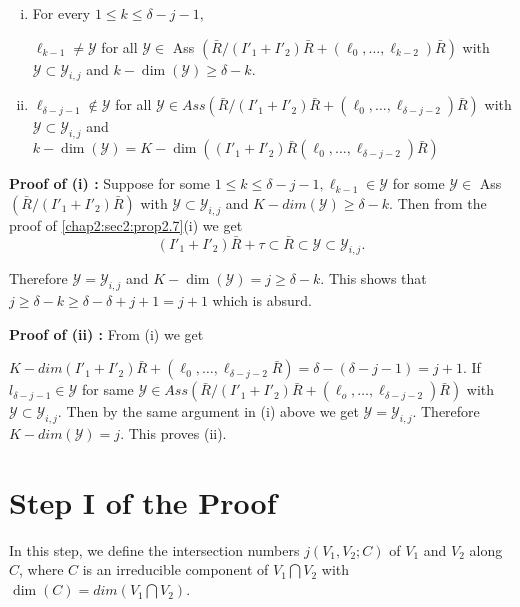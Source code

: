 \begin{enumerate}[(i)]
\item For every $1 \leq k \leq \delta -j-1$,

  $\ell_{k-1}\neq \mathscr{Y}$ for all $\mathscr{Y} \in$ Ass
  $(\bar{R}/(I'_1+I'_2)\bar{R}+(\ell_0,\ldots, \ell_{k-2})\bar{R})$
  with $\mathscr{Y}\subset \mathscr{Y}_{i,j}$ and $k-\dim
  (\mathscr{Y})\geq \delta -k$. 

\item $\ell_{\delta -j-1} \notin \mathscr{Y}$ for all $\mathscr{Y}\in
  Ass
  (\bar{R}/(I'_1+I'_2)\bar{R}+(\ell_0,\ldots,\ell_{\delta-j-2})\bar{R})$
  with $\mathscr{Y}\subset \mathscr{Y}_{i,j}$ and $k-\dim
  (\mathscr{Y})=K-\dim ((I'_1+I'_2)\bar{R}(\ell_0,\ldots, \ell_
  {\delta-j-2})\bar{R})$ 
\end{enumerate}

\noindent \textbf{Proof of (i) :}
  Suppose for some $1\leq k \leq \delta-j-1,\ell_{k-1} \in
  \mathscr{Y}$ for some $\mathscr{Y} \in$ Ass
  $(\bar{R}/(I'_1+I'_2)\bar{R})$ with $\mathscr{Y} \subset
  \mathscr{Y}_{i,j}$ and $K-dim(\mathscr{Y})\geq \delta-k$. Then from
  the proof of \ref{chap2:sec2:prop2.7}(i) we get 
$$
(I'_1+I'_2)\bar{R}+ \tau \subset \bar{R} \subset \mathscr{Y}\subset
\mathscr{Y}_{i, j}. 
$$

Therefore $\mathscr{Y}=\mathscr{Y}_{i,j}$ and $K-\dim(\mathscr{Y})=j
\geq \delta -k$. This shows that $j \geq \delta -k \geq \delta-\delta
+j+1 = j+1$ which is absurd. 

\noindent \textbf{Proof of (ii) :}
  From (i) we get

$K-dim(I'_1+I'_2)\bar{R}+(\ell_0,\ldots,
\ell_{\delta-j-2}\bar{R})=\delta-(\delta-j-1)=j+1$. If
$l_{\delta-j-1}\in \mathscr{Y}$ for same $\mathscr{Y} \in
Ass(\bar{R}/(I'_1+I'_2)\bar{R}+(\ell_o, \ldots,
\ell_{\delta-j-2})\bar{R})$ with $\mathscr{Y}\subset \mathscr{Y}_{i,
  j}$. Then by the same argument in (i) above we get $\mathscr{Y} =
\mathscr{Y}_{i, j}$. Therefore $K-dim(\mathscr{Y}) = j$. This proves
(ii). 

\section{Step I of the Proof}\label{chap2:sec3}

\begin{step}\label{chap2:sec3:step1}
  In this step, we define the intersection numbers $j (V_1, V_2 ; C)$
  of $V_1$ and $V_2$ along $C$, where $C$ is an irreducible component
  of $V_1 \bigcap V_2$ with $\dim(C)=dim (V_1 \bigcap V_2)$. 
\end{step}

